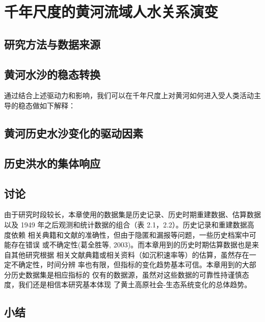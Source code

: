 \chapter{千年尺度的黄河流域人水关系演变}
\label{cha:3}


\section{研究方法与数据来源}
\label{ch3:methods}



\section{黄河水沙的稳态转换}

通过结合上述驱动力和影响，我们可以在千年尺度上对黄河如何进入受人类活动主导的稳态做如下解释：

\section{黄河历史水沙变化的驱动因素}

\section{历史洪水的集体响应}

\section{讨论}



由于研究时段较长，本章使用的数据集是历史记录、历史时期重建数据、估算数据 以及 1949 年之后观测和统计数据的组合（表 2.1，2.2）。历史记录和重建数据高度依赖 相关典籍和文献的准确性，但由于隐匿和漏报等问题，一些历史档案中可能存在错误 或不确定性(葛全胜等, 2003)。而本章用到的历史时期估算数据也是来自其他研究根据 相关文献典籍或相关资料（如沉积速率等）的估算，虽然存在一定不确定性，时间分辨 率也有限，但指标的变化趋势基本可信。本章用到的大部分历史数据集是相应指标的 仅有的数据源，虽然对这些数据的可靠性持谨慎态度，我们还是相信本研究基本体现 了黄土高原社会-生态系统变化的总体趋势。

\section{小结}